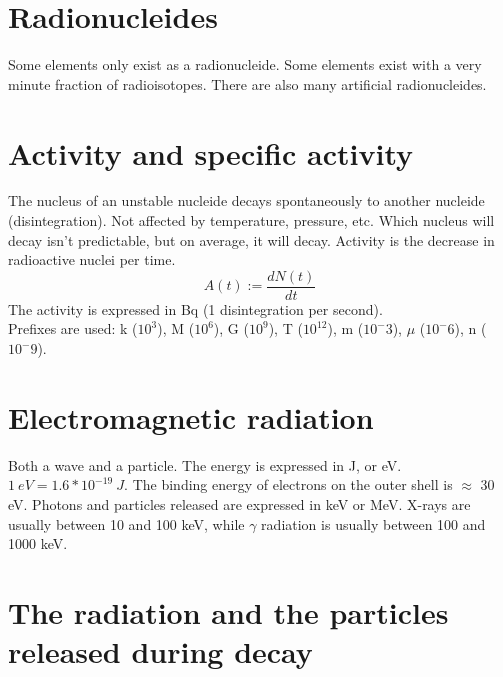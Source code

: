 \section{Radionucleides}
Some elements only exist as a radionucleide. Some elements exist with a very minute fraction of radioisotopes. There are also many artificial radionucleides.
\section{Activity and specific activity}
The nucleus of an unstable nucleide decays spontaneously to another nucleide (disintegration). Not affected by temperature, pressure, etc. Which nucleus will decay isn't predictable, but on average, it will decay. Activity is the decrease in radioactive nuclei per time.
\[A(t) := \frac{dN(t)}{dt}\]
The activity is expressed in Bq (1 disintegration per second). \\
Prefixes are used: k ($10^3$), M ($10^6$), G ($10^9$), T ($10^12$), m ($10^-3$), $\mu$ ($10^-6$), n ($10^-9$).
\section{Electromagnetic radiation}
Both a wave and a particle. The energy is expressed in J, or eV. $1\ eV = 1.6*10^{-19}\ J$. The binding energy of electrons on the outer shell is $\approx$ 30 eV. Photons and particles released are expressed in keV or MeV. X-rays are usually between 10 and 100 keV, while $\gamma$ radiation is usually between 100 and 1000 keV. 
\section{The radiation and the particles released during decay}
